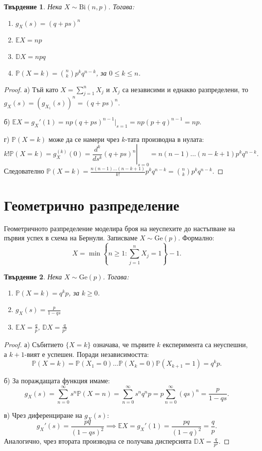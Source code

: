 \documentclass{article}
\newtheorem{theorem}{Твърдение}
\begin{document}
\begin{theorem}
Нека $X \sim \text{Bi}(n, p)$. Тогава:
\begin{enumerate}
    \item[а)] $g_X(s) = (q+ps)^n$
    \item[б)] $\mathbb{E}X = np$
    \item[в)] $\mathbb{D}X = npq$
    \item[г)] $\mathbb{P}(X=k) = \binom{n}{k} p^k q^{n-k}$, за $0 \le k \le n$.
\end{enumerate}
\end{theorem}
\begin{proof}
а) Тъй като $X = \sum_{j=1}^n X_j$ и $X_j$ са независими и еднакво разпределени, то $g_X(s) = (g_{X_1}(s))^n = (q+ps)^n$.

б) $\mathbb{E}X = g_X'(1) = np(q+ps)^{n-1} \big|_{s=1} = np(p+q)^{n-1} = np$.

г) $\mathbb{P}(X=k)$ може да се намери чрез $k$-тата производна в нулата:
\[ k! \mathbb{P}(X=k) = g_X^{(k)}(0) = \left. \frac{d^k}{ds^k} (q+ps)^n \right|_{s=0} = n(n-1)\dots(n-k+1) p^k q^{n-k}. \]
Следователно $\mathbb{P}(X=k) = \frac{n(n-1)\dots(n-k+1)}{k!} p^k q^{n-k} = \binom{n}{k} p^k q^{n-k}$.
\end{proof}

\section{Геометрично разпределение}

Геометричното разпределение моделира броя на неуспехите до настъпване на първия успех в схема на Бернули. Записваме $X \sim \text{Ge}(p)$. Формално:
\[ X = \min\left\{n \ge 1 : \sum_{j=1}^n X_j = 1\right\} - 1. \]

\begin{theorem}
Нека $X \sim \text{Ge}(p)$. Тогава:
\begin{enumerate}
    \item[а)] $\mathbb{P}(X=k) = q^k p$, за $k \ge 0$.
    \item[б)] $g_X(s) = \frac{p}{1-qs}$
    \item[в)] $\mathbb{E}X = \frac{q}{p}$, $\mathbb{D}X = \frac{q}{p^2}$
\end{enumerate}
\end{theorem}
\begin{proof}
а) Събитието $\{X=k\}$ означава, че първите $k$ експеримента са неуспешни, а $k+1$-вият е успешен. Поради независимостта:
\[ \mathbb{P}(X=k) = \mathbb{P}(X_1=0) \dots \mathbb{P}(X_k=0) \mathbb{P}(X_{k+1}=1) = q^k p. \]

б) За пораждащата функция имаме:
\[ g_X(s) = \sum_{n=0}^{\infty} s^n \mathbb{P}(X=n) = \sum_{n=0}^{\infty} s^n q^n p = p \sum_{n=0}^{\infty} (qs)^n = \frac{p}{1-qs}. \]

в) Чрез диференциране на $g_X(s)$:
\[ g_X'(s) = \frac{pq}{(1-qs)^2} \implies \mathbb{E}X = g_X'(1) = \frac{pq}{(1-q)^2} = \frac{q}{p}. \]
Аналогично, чрез втората производна се получава дисперсията $\mathbb{D}X = \frac{q}{p^2}$.
\end{proof}
\end{document}
